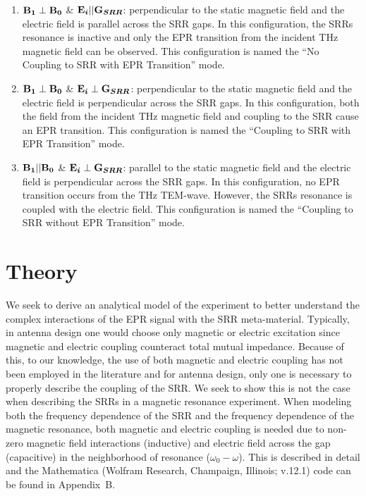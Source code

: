 \begin{enumerate}[label=(\Alph*)]
    \item $\textbf{B}\boldsymbol{_{1}} \perp \textbf{B}\boldsymbol{_{0}}$ \& $\textbf{E}\boldsymbol{_{i}}||\textbf{G}\boldsymbol{_{SRR}}$: perpendicular to the static magnetic field and the electric field is parallel across the SRR gaps. In this configuration, the SRRs resonance is inactive and only the EPR transition from the incident THz magnetic field can be observed. This configuration is named the ``No Coupling to SRR with EPR Transition'' mode. 
    \item $\textbf{B}\boldsymbol{_{1}} \perp \textbf{B}\boldsymbol{_{0}}$ \& $\textbf{E}\boldsymbol{_{i}}\perp\textbf{G}\boldsymbol{_{SRR}}$: perpendicular to the static magnetic field and the electric field is perpendicular across the SRR gaps. In this configuration, both the field from the incident THz magnetic field and coupling to the SRR cause an EPR transition. This configuration is named the ``Coupling to SRR with EPR Transition'' mode.
    \item $\textbf{B}\boldsymbol{_{1}} || \textbf{B}\boldsymbol{_{0}}$ \& $\textbf{E}\boldsymbol{_{i}}\perp\textbf{G}\boldsymbol{_{SRR}}$: parallel to the static magnetic field and the electric field is perpendicular across the SRR gaps. In this configuration, no EPR transition occurs from the THz TEM-wave. However, the SRRs resonance is coupled with the electric field. This configuration is named the ``Coupling to SRR without EPR Transition'' mode.
\end{enumerate}


\section{Theory}
We seek to derive an analytical model of the experiment to better understand the complex interactions of the EPR signal with the SRR meta-material. Typically, in antenna design one would choose only magnetic \cite{srrmodel} or electric \cite{Katsarakis04} excitation since magnetic and electric coupling counteract total mutual impedance. Because of this, to our knowledge, the use of both magnetic and electric coupling has not been employed in the literature and for antenna design, only one is necessary to properly describe the coupling of the SRR. \cite{Baena2005,DurnSindreu2012,Bojanic2014,Su2015} We seek to show this is not the case when describing the SRRs in a magnetic resonance experiment. When modeling both the frequency dependence of the SRR and the frequency dependence of the magnetic resonance, both magnetic and electric coupling is needed due to non-zero magnetic field interactions (inductive) and electric field across the gap (capacitive) in the neighborhood of resonance ($\omega_0 - \omega$). This is described in detail and the Mathematica (Wolfram Research, Champaign, Illinois; v.12.1) code can be found in Appendix~B.

